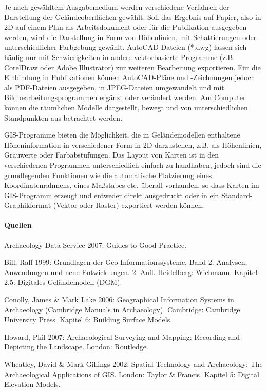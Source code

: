 Je nach gewähltem Ausgabemedium werden verschiedene Verfahren der Darstellung der Geländeoberflächen gewählt. Soll das Ergebnis auf Papier, also in 2D auf einem Plan als Arbeitsdokument oder für die Publikation ausgegeben werden, wird die Darstellung in Form von Höhenlinien, mit Schattierungen oder unterschiedlicher Farbgebung gewählt. AutoCAD-Dateien (*.dwg) lassen sich häufig nur mit Schwierigkeiten in andere vektorbasierte Programme (z.B. CorelDraw oder Adobe Illustrator) zur weiteren Bearbeitung exportieren. Für die Einbindung in Publikationen können AutoCAD-Pläne und -Zeichnungen jedoch als PDF-Dateien ausgegeben, in JPEG-Dateien umgewandelt und mit Bildbearbeitungsprogrammen ergänzt oder verändert werden. Am Computer können die räumlichen Modelle dargestellt, bewegt und von unterschiedlichen Standpunkten aus betrachtet werden.

GIS-Programme bieten die Möglichkeit, die in Geländemodellen enthaltene Höheninformation in verschiedener Form in 2D darzustellen, z.B. als Höhenlinien, Grauwerte oder Farbabstufungen. Das Layout von Karten ist in den verschiedenen Programmen unterschiedlich einfach zu handhaben, jedoch sind die grundlegenden Funktionen wie die automatische Platzierung eines Koordinatenrahmens, eines Maßstabes etc. überall vorhanden, so dass Karten im GIS-Programm erzeugt und entweder direkt ausgedruckt oder in ein Standard-Graphikformat (Vektor oder Raster) exportiert werden können.

\paragraph{Quellen}
\begin{flushleft}
Archaeology Data Service 2007: Guides to Good Practice. 

Bill, Ralf 1999: Grundlagen der Geo-Informationssysteme, Band 2: Analysen, Anwendungen und neue Entwicklungen. 2. Aufl. Heidelberg: Wichmann. Kapitel 2.5: Digitales Geländemodell (DGM).

Conolly, James \& Mark Lake 2006: Geographical Information Systems in Archaeology (Cambridge Manuals in Archaeology). Cambridge: Cambridge University Press. Kapitel 6: Building Surface Models.

Howard, Phil 2007: Archaeological Surveying and Mapping: Recording and Depicting the Landscape. London: Routledge.

Wheatley, David \& Mark Gillings 2002: Spatial Technology and Archaeology: The Archaeological Applications of GIS. London: Taylor \& Francis. Kapitel 5: Digital Elevation Models.
\end{flushleft}